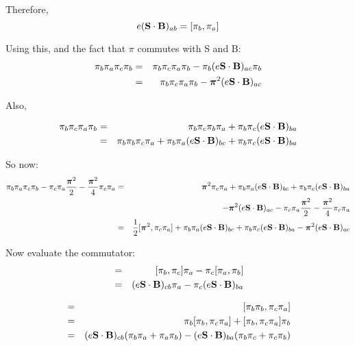 Therefore,
	$$ 	e(\mathbf{S} \cdot \mathbf{B})_{ab} = [\pi_b, \pi_a] $$



Using this, and the fact that $\pi$ commutes with S and B:
\begin{eqnarray*}
\pi_b \pi_a \pi_c \pi_b 
	&=&	\pi_b \pi_c \pi_a \pi_b 
				- \pi_b (e \mathbf{S} \cdot \mathbf{B})_{ac} \pi_b \\
	&=&	\pi_b \pi_c \pi_a \pi_b 
				-\mbox{\boldmath$ \pi $}^2 (e \mathbf{S} \cdot \mathbf{B})_{ac}	\\
\end{eqnarray*}

Also,

\begin{eqnarray*}
\pi_b \pi_c \pi_a \pi_b 
	&=&	\pi_b \pi_c \pi_b \pi_a 
				+ \pi_b \pi_c (e \mathbf{S} \cdot \mathbf{B})_{ba}	\\
	&=&	\pi_b \pi_b \pi_c \pi_a 
				+ \pi_b \pi_a (e \mathbf{S} \cdot \mathbf{B})_{bc}
				+ \pi_b \pi_c (e \mathbf{S} \cdot \mathbf{B})_{ba}	\\
\end{eqnarray*}

So now:
\begin{eqnarray*}
\pi_b \pi_a \pi_c \pi_b  
	- \pi_c \pi_a \frac{\mbox{\boldmath$ \pi $}^2}{2} 
	- \frac{\mbox{\boldmath$ \pi $}^2}{4} \pi_c \pi_a
	&=&	\mbox{\boldmath$ \pi $}^2 \pi_c \pi_a 
				+ \pi_b \pi_a (e \mathbf{S} \cdot \mathbf{B})_{bc}
				+ \pi_b \pi_c (e \mathbf{S} \cdot \mathbf{B})_{ba} \\
	&&			-\mbox{\boldmath$ \pi $}^2 (e \mathbf{S} \cdot \mathbf{B})_{ac}
				- \pi_c \pi_a \frac{\mbox{\boldmath$ \pi $}^2}{2} 
				- \frac{\mbox{\boldmath$ \pi $}^2}{4} \pi_c \pi_a	\\
	&=&	\frac{1}{2} [\mbox{\boldmath$ \pi $}^2, \pi_c \pi_a]
				+ \pi_b \pi_a (e \mathbf{S} \cdot \mathbf{B})_{bc}
				+ \pi_b \pi_c (e \mathbf{S} \cdot \mathbf{B})_{ba}
				-\mbox{\boldmath$ \pi $}^2 (e \mathbf{S} \cdot \mathbf{B})_{ac} \\
\end{eqnarray*}

Now evaluate the commutator:
\begin{eqnarray*}
[\pi_b, \pi_c \pi_a]
	&=&	[\pi_b, \pi_c]\pi_a - \pi_c [\pi_a, \pi_b]	\\
	&=&	(e \v{S} \cdot \v{B})_{cb} \pi_a
				- \pi_c (e \v{S} \cdot \v{B})_{ba}	\\
\end{eqnarray*}

\begin{eqnarray*}
[ \gv{\pi}^2, \pi_c \pi_a]
	&=&	[\pi_b \pi_b, \pi_c \pi_a]	\\
	&=&	\pi_b [\pi_b, \pi_c \pi_a] + [\pi_b, \pi_c \pi_a] \pi_b	\\
	&=&	(e \v{S} \cdot \v{B})_{cb} ( \pi_b \pi_a + \pi_a \pi_b)
				-  (e \v{S} \cdot \v{B})_{ba} (\pi_b \pi_c + \pi_c \pi_b)	\\
\end{eqnarray*}


